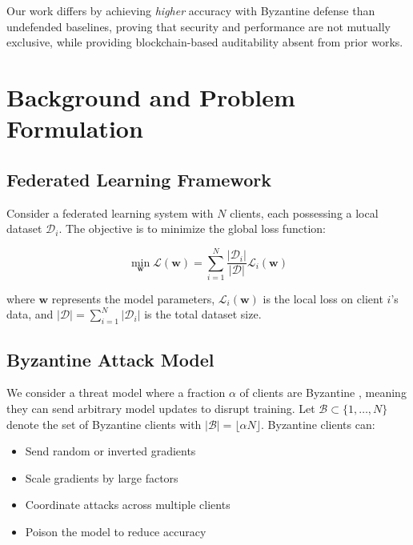 \documentclass{ieeeaccess}
\begin{document}
Our work differs by achieving \textit{higher} accuracy with Byzantine defense than undefended baselines, proving that security and performance are not mutually exclusive, while providing blockchain-based auditability absent from prior works.

\section{Background and Problem Formulation}
\label{sec:background}

\subsection{Federated Learning Framework}

Consider a federated learning system with $N$ clients, each possessing a local dataset $\mathcal{D}_i$. The objective is to minimize the global loss function:

\begin{equation}
\min_{\mathbf{w}} \mathcal{L}(\mathbf{w}) = \sum_{i=1}^{N} \frac{|\mathcal{D}_i|}{|\mathcal{D}|} \mathcal{L}_i(\mathbf{w})
\label{eq:global_loss}
\end{equation}

where $\mathbf{w}$ represents the model parameters, $\mathcal{L}_i(\mathbf{w})$ is the local loss on client $i$'s data, and $|\mathcal{D}| = \sum_{i=1}^{N} |\mathcal{D}_i|$ is the total dataset size.

\subsection{Byzantine Attack Model}

We consider a threat model where a fraction $\alpha$ of clients are Byzantine \cite{lamport1982byzantine}, meaning they can send arbitrary model updates to disrupt training. Let $\mathcal{B} \subset \{1, \ldots, N\}$ denote the set of Byzantine clients with $|\mathcal{B}| = \lfloor \alpha N \rfloor$. Byzantine clients can:

\begin{itemize}
    \item Send random or inverted gradients
    \item Scale gradients by large factors
    \item Coordinate attacks across multiple clients
    \item Poison the model to reduce accuracy
\end{itemize}
\end{document}
